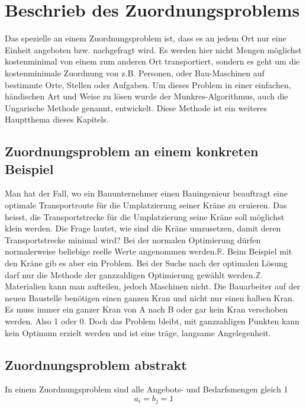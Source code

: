 %
%
%
\section{Beschrieb des Zuordnungsproblems
\label{munkres:section:teil1}}

Das spezielle an einem Zuordnungsproblem ist, dass es an jedem Ort nur eine Einheit angeboten bzw. nachgefragt wird. Es werden hier nicht Mengen möglichst kostenminimal von einem zum anderen
Ort transportiert, sondern es geht um die kostenminimale Zuordnung von z.B. Personen, oder Bau-Maschinen auf bestimmte Orte, Stellen oder Aufgaben.
Um dieses Problem in einer einfachen, händischen Art und Weise zu lösen wurde der Munkres-Algorithmus, auch die Ungarische Methode genannt, entwickelt. Diese Methode ist ein weiteres Hauptthema dieses Kapitels.

\subsection{Zuordnungsproblem an einem konkreten Beispiel
\label{munkres:subsection:bonorum}}
Man hat der Fall, wo ein Bauunternehmer einen Bauingenieur beauftragt eine optimale Transportroute für die Umplatzierung seiner Kräne zu eruieren. Das heisst, die Transportstrecke für die Umplatzierung seine Kräne
soll möglichst klein werden. 
Die Frage lautet, wie sind die Kräne umzusetzen, damit deren Transportstrecke minimal wird? Bei der normalen Optimierung dürfen normalerweise beliebige reelle Werte angenommen werden.$\mathbb{R}$. 
Beim Beispiel mit den Kräne gib es aber ein Problem. Bei der Suche nach der optimalen Lösung darf  nur die Methode der ganzzahligen Optimierung gewählt werden.$\mathbb{Z}$. Materialien kann man aufteilen, jedoch Maschinen nicht. Die Bauarbeiter auf der neuen Baustelle benötigen einen ganzen Kran und nicht nur einen halben Kran. Es muss immer ein ganzer Kran von A nach B oder gar kein Kran verschoben werden. Also 1 oder 0.
Doch das Problem bleibt, mit ganzzahligen Punkten kann kein Optimum erzielt werden und ist eine träge, langsame Angelegenheit.

\subsection{Zuordnungsproblem abstrakt
\label{munkres:subsection:bonorum}}

In einem Zuordnungsproblem sind alle Angebots- und Bedarfsmengen gleich 1 
\begin{equation}
a_{i}=b_{j}=1
\end{equation}

